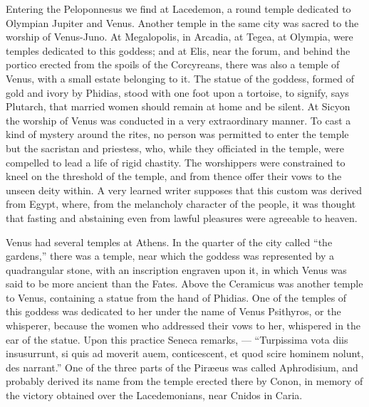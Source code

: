 \documentclass[a4paper, 11pt, oneside, polutonikogreek, english]{article}
\begin{document}
Entering the Peloponnesus we find at Lacedemon, a round temple dedicated to Olympian Jupiter and Venus. Another temple in the same city was sacred to the worship of Venus-Juno. At Megalopolis, in Arcadia, at Tegea, at Olympia, were temples dedicated to this goddess; and at Elis, near the forum, and behind the portico erected from the spoils of the Corcyreans, there was also a temple of Venus, with a small estate belonging to it. The statue of the goddess, formed of gold and ivory by Phidias, stood with one foot upon a tortoise, to signify, says Plutarch, that married women should remain at home and be silent. At Sicyon the worship of Venus was conducted in a very extraordinary manner. To cast a kind of mystery around the rites, no person was permitted to enter the temple but the sacristan and priestess, who, while they officiated in the temple, were compelled to lead a life of rigid chastity. The worshippers were constrained to kneel on the threshold of the temple, and from thence offer their vows to the unseen deity within. A very learned writer supposes that this custom was derived from Egypt, where, from the melancholy character of the people, it was thought that fasting and abstaining even from lawful pleasures were agreeable to heaven.

Venus had several temples at Athens. In the quarter of the city called ``the gardens,'' there was a temple, near which the goddess was represented by a quadrangular stone, with an inscription engraven upon it, in which Venus was said to be more ancient than the Fates. Above the Ceramicus was another temple to Venus, containing a statue from the hand of Phidias. One of the temples of this goddess was dedicated to her under the name of Venus Psithyros, or the whisperer, because the women who addressed their vows to her, whispered in the ear of the statue. Upon this practice Seneca remarks, --- ``Turpissima vota diis insusurrunt, si quis ad moverit auem, conticescent, et quod scire hominem nolunt, des narrant.'' One of the three parts of the Piræeus was called Aphrodisium, and probably derived its name from the temple erected there by Conon, in memory of the victory obtained over the Lacedemonians, near Cnidos in Caria.
\end{document}
